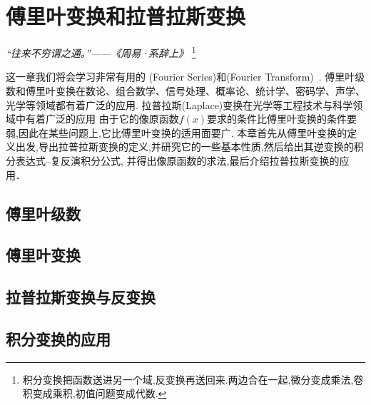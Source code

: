 \chapter{傅里叶变换和拉普拉斯变换}

\begin{flushright}
\textit{“往来不穷谓之通。”——《周易·系辞上》}
\footnote{积分变换把函数送进另一个域,反变换再送回来.两边合在一起,微分变成乘法,卷积变成乘积,初值问题变成代数.}
\end{flushright}

这一章我们将会学习非常有用的
(Fourier Series)和(Fourier Transform)~\cite{fourier,bracewell,lighthill}.
傅里叶级数和傅里叶变换在数论、组合数学、信号处理、概率论、统计学、密码学、声学、光学等领域都有着广泛的应用.
拉普拉斯(Laplace)变换在光学等工程技术与科学领域中有着广泛的应用
% 
由于它的像原函数$f(x)$要求的条件比傅里叶变换的条件要弱,因此在某些问题上,它比傅里叶变换的适用面要广.
本章首先从傅里叶变换的定义出发,导出拉普拉斯变换的定义,并研究它的一些基本性质,然后给出其逆变换的积分表达式--复反演积分公式,
并得出像原函数的求法,最后介绍拉普拉斯变换的应用．

\section{傅里叶级数}
\label{sec:fourier_series}

\section{傅里叶变换}
\label{sec:fourier_transform}



\section{拉普拉斯变换与反变换}
\label{sec:laplace_transform_and_inverse_transform}



\section{积分变换的应用}
\label{sec:integral_transform_applications}

